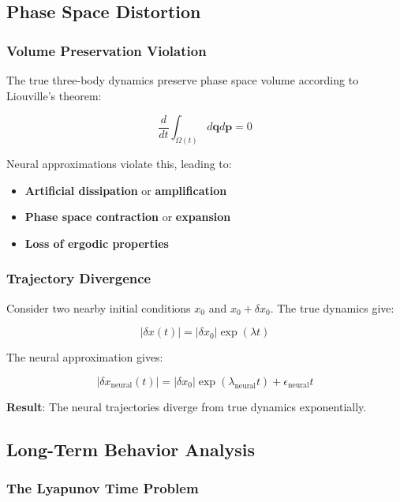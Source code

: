 \documentclass[11pt,a4paper]{article}
\begin{document}
\subsection{Phase Space Distortion}

\subsubsection{Volume Preservation Violation}

The true three-body dynamics preserve phase space volume according to Liouville's theorem:

\begin{equation}
\frac{d}{dt} \int_{\Omega(t)} d\mathbf{q} d\mathbf{p} = 0
\end{equation}

Neural approximations violate this, leading to:
\begin{itemize}
    \item \textbf{Artificial dissipation} or \textbf{amplification}
    \item \textbf{Phase space contraction} or \textbf{expansion}
    \item \textbf{Loss of ergodic properties}
\end{itemize}

\subsubsection{Trajectory Divergence}

Consider two nearby initial conditions $x_0$ and $x_0 + \delta x_0$. The true dynamics give:

\begin{equation}
|\delta x(t)| = |\delta x_0| \exp(\lambda t)
\end{equation}

The neural approximation gives:

\begin{equation}
|\delta x_{\text{neural}}(t)| = |\delta x_0| \exp(\lambda_{\text{neural}} t) + \epsilon_{\text{neural}} t
\end{equation}

\textbf{Result}: The neural trajectories diverge from true dynamics exponentially.

\subsection{Long-Term Behavior Analysis}

\subsubsection{The Lyapunov Time Problem}
\end{document}
